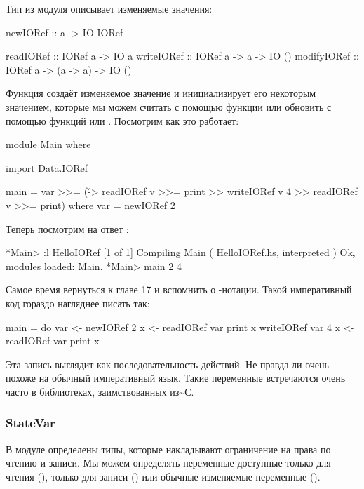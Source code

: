Тип  из модуля  описывает изменяемые значения:


\begin{code}
newIORef :: a -> IO IORef

readIORef   :: IORef a -> IO a
writeIORef  :: IORef a -> a -> IO ()
modifyIORef :: IORef a -> (a -> a) -> IO ()
\end{code}

Функция  создаёт изменяемое значение и инициализирует его
некоторым значением, которые мы можем считать с помощью функции
 или обновить с помощью функций  или
. Посмотрим как это работает:


\begin{code}
module Main where

import Data.IORef

main = var >>= (\v -> 
       readIORef v >>= print 
    >> writeIORef v 4 
    >> readIORef v >>= print)
    where var = newIORef 2    
\end{code}

Теперь посмотрим на ответ :


\begin{code}
*Main> :l HelloIORef
[1 of 1] Compiling Main             ( HelloIORef.hs, interpreted )
Ok, modules loaded: Main.
*Main> main
2
4
\end{code}

Самое время вернуться к главе 17 и вспомнить о -нотации. Такой
императивный код гораздо нагляднее писать так:


\begin{code}
main = do
    var <- newIORef 2
    x <- readIORef var
    print x
    writeIORef var 4
    x <- readIORef var
    print x
\end{code}

Эта запись выглядит как последовательность действий. Не правда ли очень
похоже на обычный императивный язык. Такие переменные встречаются очень
часто в библиотеках, заимствованных из\textasciitilde{}С.

\subsubsection{StateVar}

В модуле  определены типы, которые накладывают
ограничение на права по чтению и записи. Мы можем определять переменные
доступные только для чтения (), только для записи
() или обычные изменяемые переменные
().

